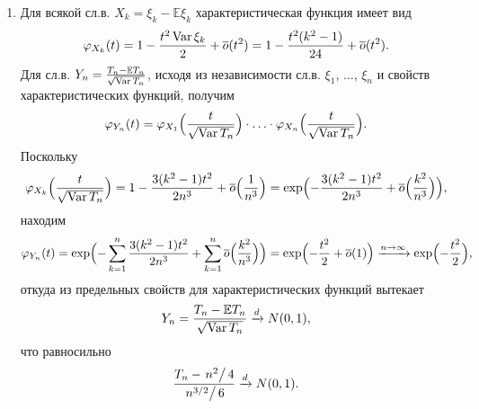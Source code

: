 \begin{solution}
\begin{enumerate}
\item 
Для всякой сл.в. $X_k=\xi_k-{\mathbb E}\xi_k$ характеристическая функция имеет вид 
$$
\varphi_{X_k}(t)=1-\frac{t^2 \mathop{\mathrm{Var}}\nolimits\xi_k}{2}+{\overline o}(t^2)=1-\frac{t^2(k^2-1)}{24}+{\overline o}(t^2) . 
$$
Для сл.в. $Y_n=\frac{T_n-{\mathbb E}T_n}{\sqrt{\mathop{\mathrm{Var}}\nolimits T_n}}$, исходя из независимости сл.в. 
$\xi_1$, $\ldots$, $\xi_n$ и свойств характеристических функций, получим 
$$
\varphi_{Y_n}(t)=\varphi_{X_1}\Bigl( \frac{t}{\sqrt{\mathop{\mathrm{Var}}\nolimits T_n}} \Bigr)\cdot\ldots \cdot \varphi_{X_n}\Bigl( \frac{t}{\sqrt{\mathop{\mathrm{Var}}\nolimits T_n}} \Bigr). 
$$
Поскольку 
$$
\varphi_{X_k}\Bigl( \frac{t}{\sqrt{\mathop{\mathrm{Var}}\nolimits T_n}} \Bigr)=1-\frac{3(k^2-1) t^2}{2n^3}+{\overline o}\Bigl( \frac{1}{n^3} \Bigr)=
\exp\Bigl( -\frac{3(k^2-1) t^2}{2n^3}+{\overline o}\Bigl( \frac{k^2}{n^3} \Bigr) \Bigr) , 
$$
находим 
$$
\varphi_{Y_n}(t)=\exp\Bigl( -\sum\limits_{k=1}^n \frac{3(k^2-1) t^2}{2n^3}+\sum\limits_{k=1}^n {\overline o}\Bigl( \frac{k^2}{n^3} \Bigr)
\Bigr)=\exp\Bigl( -\frac{t^2}{2}+{\overline o}(1)\Bigr)\xrightarrow{n\to\infty} \exp\Bigl(-\frac{t^2}{2}\Bigr) , 
$$
откуда из предельных свойств для характеристических функций вытекает 
$$
Y_n=\frac{T_n-{\mathbb E}T_n}{\sqrt{\mathop{\mathrm{Var}}\nolimits T_n}}\xrightarrow{d} N(0,1) , 
$$
что равносильно 
$$\frac{T_n-\left.n^2\right/4}{\left.n^{3/2}\right/6}\xrightarrow{d} N(0,1) . 
$$

\end{enumerate}
\end{solution}
